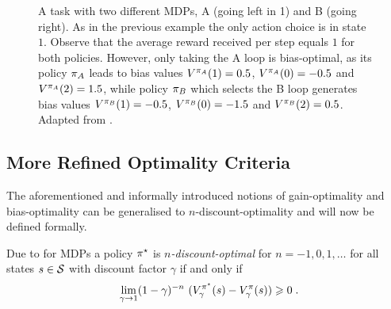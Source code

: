 \documentclass[envcountsame]{llncs}
\begin{document}
\begin{figure}[t!]
  \centering
  \caption{\label{fig:three-states} A task with two different MDPs, A (going left in 1) and B
    (going right). As in the previous example the only action choice is in state \(1\). Observe
    that the average reward received per step equals \(1\) for both policies. However, only taking
    the A loop is bias-optimal, as its policy \(\pi_{A}\) leads to bias values
    \(V^{\pi_{A}}(1)=0.5\), \(V^{\pi_{A}}(0)=-0.5\) and \(V^{\pi_{A}}(2)=1.5\), while policy
    \(\pi_{B}\) which selects the B loop generates bias values \(V^{\pi_{B}}(1)=-0.5\),
    \(V^{\pi_{B}}(0)=-1.5\) and \(V^{\pi_{B}}(2)=0.5\). Adapted from
    \cite{Mahadevan96_AverageRewardReinforcementLearningFoundationsAlgorithmsAndEmpiricalResults}.}
\end{figure}


\subsection{More Refined Optimality Criteria}
\label{subsec:More_Refined_Optimality_Criteria}

The aforementioned and informally introduced notions of gain-optimality and bias-optimality can be
generalised to \(n\)-discount-optimality and will now be defined formally.

\begin{definition}
  Due to \cite{Veinott69} for MDPs a policy \(\pi^{\star}\) is \emph{\(n\)-discount-optimal} for
  \(n=-1,0,1,\ldots\) for all states \(s \in \mathcal{S}\) with discount factor
  \(\gamma\) %
  if and only if
  \begin{align*}
    \lim_{\gamma \to 1}(1-\gamma)^{-n}\ (V_{\gamma}^{\polopt}(s) - V_{\gamma}^{\pol}(s)) \geqslant 0 \tpkt
  \end{align*}
\end{definition}
\end{document}
